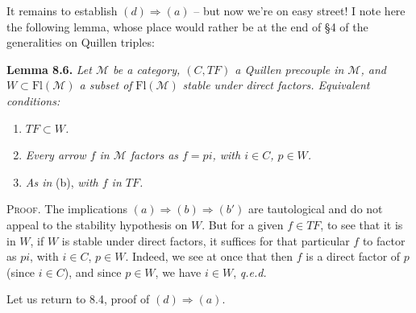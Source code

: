 It remains to establish $(d) \Longrightarrow (a)$ – but now we're on easy street! I note here the following lemma, whose place would rather be at the end of \S4 of the generalities on Quillen triples:


\textbf{Lemma 8.6.} \textit{Let $\mathcal{M}$ be a category, $(C,TF)$ a Quillen precouple in $\mathcal{M}$, and $W \subset \mathrm{Fl}(\mathcal{M})$ a subset of} $\mathrm{Fl}(\mathcal{M})$ \textit{stable under direct factors. Equivalent conditions:}
\begin{enumerate}[leftmargin=2.5em]
\item[a)] \textit{$TF \subset W$.}
\item[b)] \textit{Every arrow $f$ in $\mathcal{M}$ factors as $f = pi$, with $i \in C$, $p \in W$.}
\item[b$'$)] \textit{As in} (b), \textit{with $f$ in $TF$.}
\end{enumerate}

\textsc{Proof}. The implications $(a) \Longrightarrow (b) \Longrightarrow (b')$ are tautological and do not appeal to the stability hypothesis on $W$. But for a given $f \in TF$, to see that it is in $W$, if $W$ is stable under direct factors, it suffices for that particular $f$ to factor as $pi$, with $i \in C$, $p \in W$. Indeed, we see at once that then $f$ is a direct factor of $p$ (since $i \in C$), and since $p \in W$, we have $i \in W$, \quad \textit{q.e.d.} %

Let us return to 8.4, proof of $(d) \Longrightarrow (a)$.




